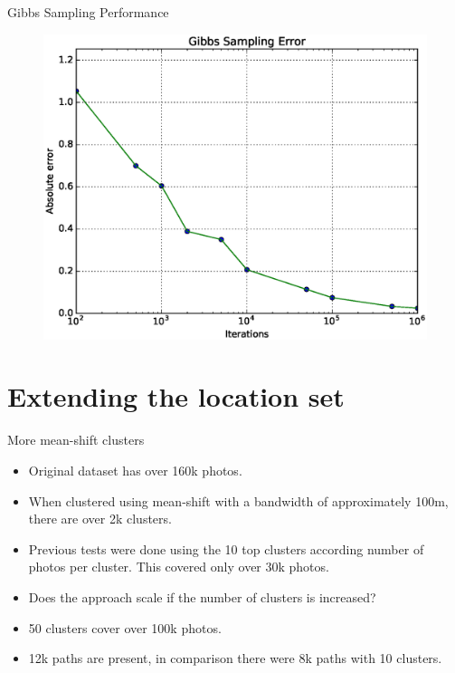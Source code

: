 \documentclass{beamer}
\begin{document}
\begin{frame}{Gibbs Sampling Performance}
  \begin{figure}
    \centering
    \includegraphics[height=0.8\textheight]{gibbs_performance}
  \end{figure}
\end{frame}

\section{Extending the location set}

\begin{frame}{More mean-shift clusters}
  \begin{itemize}
    \item Original dataset has over 160k photos.
    \item When clustered using mean-shift with a bandwidth of approximately 100m, there are over 2k clusters.
    \item Previous tests were done using the 10 top clusters according number of photos per cluster. This covered only over 30k photos.
    \item Does the approach scale if the number of clusters is increased?
    \item 50 clusters cover over 100k photos.
    \item 12k paths are present, in comparison there were 8k paths with 10 clusters.
  \end{itemize}
\end{frame}
\end{document}
